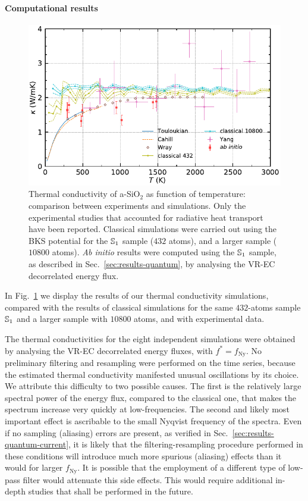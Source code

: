 \paragraph{Computational results}
\begin{figure}[!tb]
    \centering
    \includegraphics[width=\textwidth]{chapters/chapter6/figures/silica_expkappa_qkappa.pdf}
    \caption{Thermal conductivity of a-SiO$_2$ as function of temperature: comparison between experiments and simulations. 
    Only the experimental studies that accounted for radiative heat transport have been reported. 
    Classical simulations were carried out using the BKS potential for the $\S1$ sample ($432$ atoms), and a larger sample ($10800$ atoms).
    \emph{Ab initio} results were computed using the $\S1$ sample, as described in Sec.~\ref{sec:results-quantum}, by analysing the VR-EC decorrelated energy flux. 
    }
    \label{fig:results-quantum-kappa-temp}
\end{figure}
In Fig.~\ref{fig:results-quantum-kappa-temp} we display the results of our \abinitio thermal conductivity simulations, compared with the results of classical simulations for the same $432$-atoms sample $\S1$ and a larger sample with $10800$ atoms, and with experimental data. 

The \abinitio thermal conductivities for the eight independent simulations were obtained by analysing the VR-EC decorrelated energy fluxes, with $f^*=f_\mathrm{Ny}$. 
No preliminary filtering and resampling were performed on the time series, because the estimated thermal conductivity manifested unusual oscillations by its choice. We attribute this difficulty to two possible causes. 
The first is the relatively large spectral power of the \abinitio energy flux, compared to the classical one, that makes the spectrum increase very quickly at low-frequencies. 
The second and likely most important effect is ascribable to the small Nyqvist frequency of the \abinitio spectra. Even if no sampling (aliasing) errors are present, as verified in Sec.~\ref{sec:results-quantum-current}, it is likely that the filtering-resampling procedure performed in these conditions will introduce much more spurious (aliasing) effects than it would for larger $f_\mathrm{Ny}$. It is possible that the employment of a different type of low-pass filter would attenuate this side effects. 
This would require additional in-depth studies that shall be performed in the future. 

